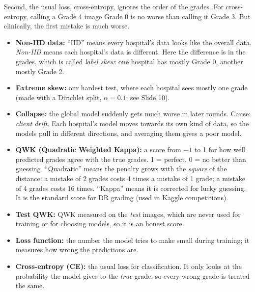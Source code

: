 \documentclass[11pt,a4paper]{article}
\newenvironment{terms}{%
  \par\smallskip\noindent{\color{accent}\small\bfseries TERMS ON THIS SLIDE}\par
  \begin{itemize}[leftmargin=1.2em,itemsep=2pt,topsep=2pt,label={\color{accent}\textbullet}]\small}%
  {\end{itemize}}
\newcommand{\term}[1]{\textbf{#1:}}
\begin{document}
Second, the usual loss, cross-entropy, ignores the order of the grades. For cross-entropy, calling
a Grade 4 image Grade 0 is no worse than calling it Grade 3. But clinically, the first mistake is
much worse.
\begin{terms}
\item \term{Non-IID data} ``IID'' means every hospital's data looks like the overall data.
\emph{Non-IID} means each hospital's data is different. Here the difference is in the grades, which
is called \emph{label skew}: one hospital has mostly Grade 0, another mostly Grade 2.
\item \term{Extreme skew} our hardest test, where each hospital sees mostly one grade (made with a
Dirichlet split, $\alpha = 0.1$; see Slide 10).
\item \term{Collapse} the global model suddenly gets much worse in later rounds. Cause:
\emph{client drift}. Each hospital's model moves towards its own kind of data, so the models pull
in different directions, and averaging them gives a poor model.
\item \term{QWK (Quadratic Weighted Kappa)} a score from $-1$ to 1 for how well predicted grades
agree with the true grades. 1 = perfect, 0 = no better than guessing. ``Quadratic'' means the
penalty grows with the \emph{square} of the distance: a mistake of 2 grades costs 4 times a mistake
of 1 grade; a mistake of 4 grades costs 16 times. ``Kappa'' means it is corrected for lucky
guessing. It is the standard score for DR grading (used in Kaggle competitions).
\item \term{Test QWK} QWK measured on the \emph{test} images, which are never used for training or
for choosing models, so it is an honest score.
\item \term{Loss function} the number the model tries to make small during training; it measures
how wrong the predictions are.
\item \term{Cross-entropy (CE)} the usual loss for classification. It only looks at the probability
the model gives to the \emph{true} grade, so every wrong grade is treated the same.
\end{terms}
\end{document}
